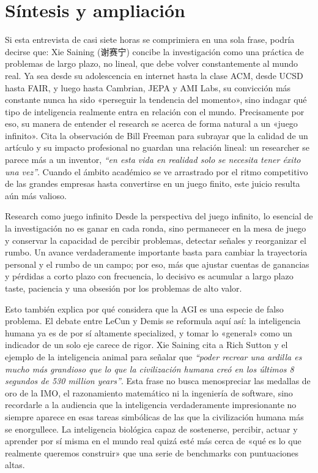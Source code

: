 \section{Síntesis y ampliación}

Si esta entrevista de casi siete horas se comprimiera en una sola frase, podría decirse que: Xie Saining (谢赛宁) concibe la investigación como una práctica de problemas de largo plazo, no lineal, que debe volver constantemente al mundo real. Ya sea desde su adolescencia en internet hasta la clase ACM, desde UCSD hasta FAIR, y luego hasta Cambrian, JEPA y AMI Labs, su convicción más constante nunca ha sido «perseguir la tendencia del momento», sino indagar qué tipo de inteligencia realmente entra en relación con el mundo. Precisamente por eso, su manera de entender el research se acerca de forma natural a un «juego infinito». Cita la observación de Bill Freeman para subrayar que la calidad de un artículo y su impacto profesional no guardan una relación lineal: un researcher se parece más a un inventor, \textit{``en esta vida en realidad solo se necesita tener éxito una vez''}. Cuando el ámbito académico se ve arrastrado por el ritmo competitivo de las grandes empresas hasta convertirse en un juego finito, este juicio resulta aún más valioso.

\begin{importantbox}{Research como juego infinito}
Desde la perspectiva del juego infinito, lo esencial de la investigación no es ganar en cada ronda, sino permanecer en la mesa de juego y conservar la capacidad de percibir problemas, detectar señales y reorganizar el rumbo. Un avance verdaderamente importante basta para cambiar la trayectoria personal y el rumbo de un campo; por eso, más que ajustar cuentas de ganancias y pérdidas a corto plazo con frecuencia, lo decisivo es acumular a largo plazo taste, paciencia y una obsesión por los problemas de alto valor.
\end{importantbox}

Esto también explica por qué considera que la AGI es una especie de falso problema. El debate entre LeCun y Demis se reformula aquí así: la inteligencia humana ya es de por sí altamente specialized, y tomar lo «general» como un indicador de un solo eje carece de rigor. Xie Saining cita a Rich Sutton y el ejemplo de la inteligencia animal para señalar que \textit{``poder recrear una ardilla es mucho más grandioso que lo que la civilización humana creó en los últimos 8 segundos de 530 million years''}. Esta frase no busca menospreciar las medallas de oro de la IMO, el razonamiento matemático ni la ingeniería de software, sino recordarle a la audiencia que la inteligencia verdaderamente impresionante no siempre aparece en esas tareas simbólicas de las que la civilización humana más se enorgullece. La inteligencia biológica capaz de sostenerse, percibir, actuar y aprender por sí misma en el mundo real quizá esté más cerca de «qué es lo que realmente queremos construir» que una serie de benchmarks con puntuaciones altas.

